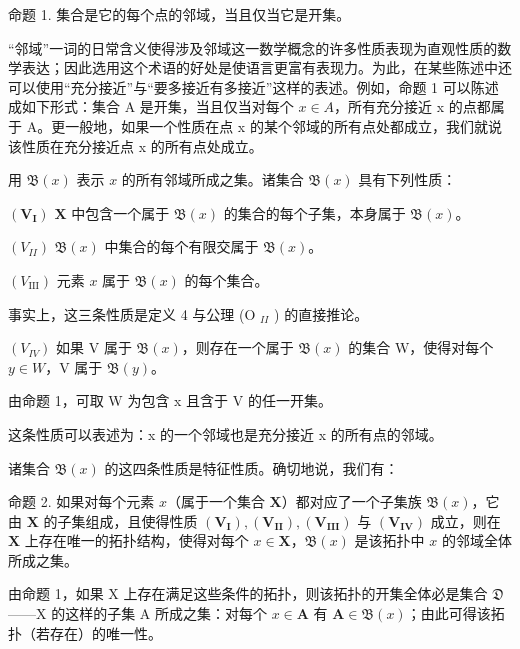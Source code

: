 命题 1. 集合是它的每个点的邻域，当且仅当它是开集。

“邻域”一词的日常含义使得涉及邻域这一数学概念的许多性质表现为直观性质的数学表达；因此选用这个术语的好处是使语言更富有表现力。为此，在某些陈述中还可以使用“充分接近”与“要多接近有多接近”这样的表述。例如，命题 1 可以陈述成如下形式：集合 A 是开集，当且仅当对每个 \(x \in A\)，所有充分接近 x 的点都属于 A。更一般地，如果一个性质在点 x 的某个邻域的所有点处都成立，我们就说该性质在充分接近点 x 的所有点处成立。

用 \(\mathfrak{B}(x)\) 表示 \(x\) 的所有邻域所成之集。诸集合 \(\mathfrak{B}(x)\) 具有下列性质：

\((\mathbf{V}_{\mathbf{I}})\) \(\mathbf{X}\) 中包含一个属于 \(\mathfrak{B}(x)\) 的集合的每个子集，本身属于 \(\mathfrak{B}(x)\)。

\((V_{II})\) \(\mathfrak{B}(x)\) 中集合的每个有限交属于 \(\mathfrak{B}(x)\)。

\((V_{\mathrm{III}})\) 元素 \(x\) 属于 \(\mathfrak{B}(x)\) 的每个集合。

事实上，这三条性质是定义 4 与公理 (O \(_{II}\) ) 的直接推论。

\((V_{IV})\) 如果 V 属于 \(\mathfrak{B}(x)\)，则存在一个属于 \(\mathfrak{B}(x)\) 的集合 W，使得对每个 \(y \in W\)，V 属于 \(\mathfrak{B}(y)\)。

由命题 1，可取 W 为包含 x 且含于 V 的任一开集。

这条性质可以表述为：x 的一个邻域也是充分接近 x 的所有点的邻域。

诸集合 \(\mathfrak{B}(x)\) 的这四条性质是特征性质。确切地说，我们有：

命题 2. 如果对每个元素 \(x\)（属于一个集合 \(\mathbf{X}\)）都对应了一个子集族 \(\mathfrak{B}(x)\)，它由 \(\mathbf{X}\) 的子集组成，且使得性质 \((\mathbf{V}_{\mathbf{I}}), (\mathbf{V}_{\mathbf{II}}), (\mathbf{V}_{\mathbf{III}})\) 与 \((\mathbf{V}_{\mathbf{IV}})\) 成立，则在 \(\mathbf{X}\) 上存在唯一的拓扑结构，使得对每个 \(x \in \mathbf{X}\)，\(\mathfrak{B}(x)\) 是该拓扑中 \(x\) 的邻域全体所成之集。

由命题 1，如果 X 上存在满足这些条件的拓扑，则该拓扑的开集全体必是集合 \(\mathfrak{D}\)——X 的这样的子集 A 所成之集：对每个 \(x \in \mathbf{A}\) 有 \(\mathbf{A} \in \mathfrak{B}(x)\)；由此可得该拓扑（若存在）的唯一性。

